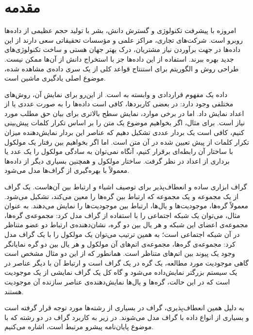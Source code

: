 \clearpage
{}
\chapter*{مقدمه}

امروزه با پیشرفت تکنولوژی و گسترش دانش، بشر با تولید حجم عظیمی از داده‌ها روبرو است. شرکت‌های تجاری، مراکز علمی و مؤسسات تحقیقاتی سعی دارند از این داده‌ها در جهت برآوردن نیاز مشتریان، درک بهتر جهان هستی و ساخت تکنولوژی‌های جدید بهره ببرند. استفاده از این داده‌ها جز با استخراج دانش از آن‌ها ممکن نیست. طراحی روش و الگوریتم برای استنتاج قواعد کلی از یک سری داده‌ی مشاهده شده، موضوع اصلی یادگیری ماشین است.

داده یک مفهوم قراردادی و وابسته به  است. از این‌رو برای نمایش آن، روش‌های مختلفی وجود دارد: در بعضی کاربردها، کافی است داده‌ها را به صورت عددی یا  از اعداد نمایش داد. اما در برخی موارد، نمایش سطح بالاتری برای بیان حق مطلب مورد نیاز است. برای مثال، اگر بخواهیم موضوع یک متن را بر اساس تکرار کلمات پیش‌بینی کنیم، کافی است یک بردار عددی تشکیل دهیم که عناصر این بردار نمایش‌دهنده میزان تکرار کلمات از پیش تعیین شده در آن متن است. اما اگر بخواهیم بین رفتار یک مولکول با ساختار آن رابطه‌ای برقرار کنیم، آنگاه نمی‌توان به سادگی مولکول را یک عدد یا برداری از اعداد در نظر گرفت. ساختار مولکول و همچنین بسیاری دیگر از داده‌ها معمولاً با بهره‌گیری از گراف‌ها مدل می‌شود.

گراف ابزاری ساده و انعطاف‌پذیر برای توصیف اشیاء و ارتباط بین آن‌هاست. یک گراف از یک مجموعه  و یک مجموعه  که ارتباط بین گره‌ها را معین می‌کند، تشکیل می‌شود. معمولاً  گره‌ها، موجودیت‌ها و یال‌ها، ارتباط بین موجودیت‌ها را نمایش می‌دهند. به عنوان مثال، می‌توان یک شبکه اجتماعی را با استفاده از گراف مدل کرد: مجموعه‌ی گره‌ها، مجموعه‌ی اعضای این شبکه و هر یال بین دو گره، نشان‌دهنده‌ی ارتباط دو عضو متناظر در آن شبکه اجتماعی است؛ به همین ترتیب می‌توان یک مولکول را با یک گراف مدل کرد: مجموعه‌ی گره‌ها، مجموعه‌ی اتم‌های آن مولکول و هر یال بین دو گره نمایانگر وجود یک پیوند بین اتم‌های متناظر است. همانطور که از این دو مثال مشخص است گاهی موجودیت مورد مطالعه، یک گره در یک گراف است و ارتباط آن با دیگر عناصر در یک سیستم بزرگتر نمایش‌داده می‌شود و گاه کل یک گراف نمایشی از یک موجودیت است که در این حالت، گره‌ها و یال‌ها نمایش‌دهنده‌ی عناصر سازنده آن موجودیت هستند.

به دلیل همین انعطاف‌پذیری، گراف در بسیاری از رشته‌ها مورد توجه قرار گرفته است و بسیاری از انواع داده با گراف مدل می‌شوند. در زیر به کاربرد گراف در دو رشته که با موضوع پایان‌نامه پیشرو مرتبط است، اشاره می‌کنیم.

